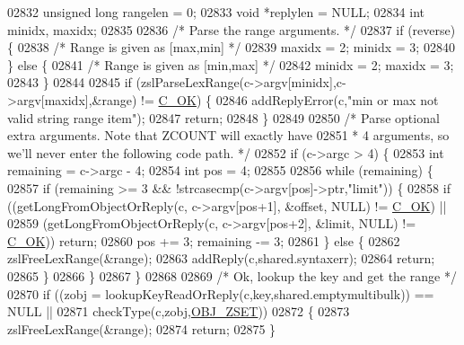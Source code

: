 \begin{DoxyCode}
02832     \textcolor{keywordtype}{unsigned} \textcolor{keywordtype}{long} rangelen = 0;
02833     \textcolor{keywordtype}{void} *replylen = NULL;
02834     \textcolor{keywordtype}{int} minidx, maxidx;
02835 
02836     \textcolor{comment}{/* Parse the range arguments. */}
02837     \textcolor{keywordflow}{if} (reverse) \{
02838         \textcolor{comment}{/* Range is given as [max,min] */}
02839         maxidx = 2; minidx = 3;
02840     \} \textcolor{keywordflow}{else} \{
02841         \textcolor{comment}{/* Range is given as [min,max] */}
02842         minidx = 2; maxidx = 3;
02843     \}
02844 
02845     \textcolor{keywordflow}{if} (zslParseLexRange(c->argv[minidx],c->argv[maxidx],&range) != \hyperlink{server_8h_a303769ef1065076e68731584e758d3e1}{C\_OK}) \{
02846         addReplyError(c,\textcolor{stringliteral}{"min or max not valid string range item"});
02847         \textcolor{keywordflow}{return};
02848     \}
02849 
02850     \textcolor{comment}{/* Parse optional extra arguments. Note that ZCOUNT will exactly have}
02851 \textcolor{comment}{     * 4 arguments, so we'll never enter the following code path. */}
02852     \textcolor{keywordflow}{if} (c->argc > 4) \{
02853         \textcolor{keywordtype}{int} remaining = c->argc - 4;
02854         \textcolor{keywordtype}{int} pos = 4;
02855 
02856         \textcolor{keywordflow}{while} (remaining) \{
02857             \textcolor{keywordflow}{if} (remaining >= 3 && !strcasecmp(c->argv[pos]->ptr,\textcolor{stringliteral}{"limit"})) \{
02858                 \textcolor{keywordflow}{if} ((getLongFromObjectOrReply(c, c->argv[pos+1], &offset, NULL) != 
      \hyperlink{server_8h_a303769ef1065076e68731584e758d3e1}{C\_OK}) ||
02859                     (getLongFromObjectOrReply(c, c->argv[pos+2], &limit, NULL) != 
      \hyperlink{server_8h_a303769ef1065076e68731584e758d3e1}{C\_OK})) \textcolor{keywordflow}{return};
02860                 pos += 3; remaining -= 3;
02861             \} \textcolor{keywordflow}{else} \{
02862                 zslFreeLexRange(&range);
02863                 addReply(c,shared.syntaxerr);
02864                 \textcolor{keywordflow}{return};
02865             \}
02866         \}
02867     \}
02868 
02869     \textcolor{comment}{/* Ok, lookup the key and get the range */}
02870     \textcolor{keywordflow}{if} ((zobj = lookupKeyReadOrReply(c,key,shared.emptymultibulk)) == NULL ||
02871         checkType(c,zobj,\hyperlink{server_8h_a8c356422ddbc03bd77694880a30a1953}{OBJ\_ZSET}))
02872     \{
02873         zslFreeLexRange(&range);
02874         \textcolor{keywordflow}{return};
02875     \}

\end{DoxyCode}
